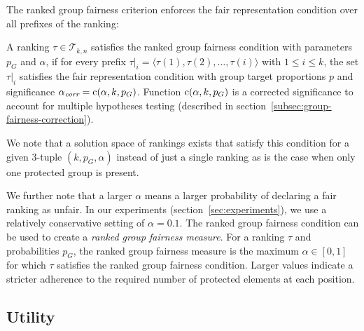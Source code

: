 The ranked group fairness criterion enforces the fair representation condition over all prefixes of the ranking:

\begin{definition}
	\label{def:ranked-group-fairness-condition}
	A ranking $\tau \in {\mathcal T}_{k,n}$ satisfies the ranked group fairness condition with parameters $p_G$ and $\alpha$, if for every prefix $\tau|_i = \langle \tau(1), \tau(2), \dots, \tau(i) \rangle$ with $1 \le i \le k$, the set $\tau|_i$ satisfies the fair representation condition with group target proportions $p$ and significance $\alpha_\textit{corr} = \operatorname{c}(\alpha, k, p_G)$.
	Function $\operatorname{c}(\alpha, k, p_G)$ is a corrected significance to account for multiple hypotheses testing (described in section~\ref{subsec:group-fairness-correction}).
\end{definition}

We note that a solution space of rankings exists that satisfy this condition for a given 3-tuple $(k, p_G, \alpha)$ instead of just a single ranking as is the case when only one protected group is present.

We further note that a larger $\alpha$ means a larger probability of declaring a fair ranking as unfair.
%
In our experiments (section~\ref{sec:experiments}), we use a relatively conservative setting of $\alpha=0.1$.
%
The ranked group fairness condition can be used to create a \emph{ranked group fairness measure}. For a ranking $\tau$ and probabilities $p_G$, the ranked group fairness measure is the maximum $\alpha \in [0,1]$ for which $\tau$ satisfies the ranked group fairness condition.
%
Larger values indicate a stricter adherence to the required number of protected elements at each position.

\subsection{Utility}
\label{subsec:individual-fairness}

